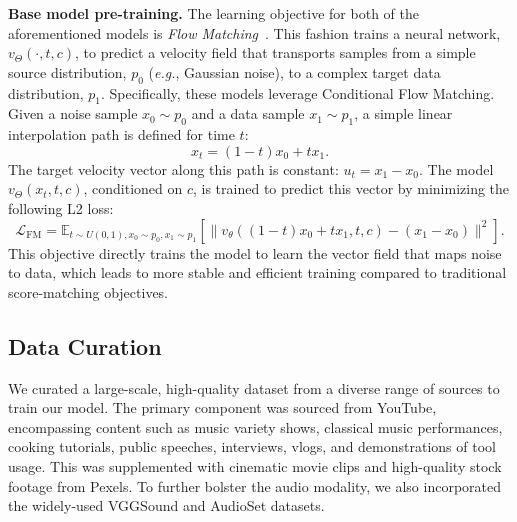 \textbf{Base model pre-training.} The learning objective for both of the aforementioned models is \textit{Flow Matching}~\cite{lipman2022flow}. This fashion trains a neural network, $v_\Theta(\cdot, t, c)$, to predict a velocity field that transports samples from a simple source distribution, $p_0$ (\textit{e.g.}, Gaussian noise), to a complex target data distribution, $p_1$. Specifically, these models leverage Conditional Flow Matching. Given a noise sample $x_0 \sim p_0$ and a data sample $x_1 \sim p_1$, a simple linear interpolation path is defined for time $t$:
\begin{equation}
    x_t = (1-t)x_0 + t x_1.
\end{equation}
The target velocity vector along this path is constant: $u_t = x_1 - x_0$. The model $v_\Theta(x_t, t, c)$, conditioned on $c$, is trained to predict this vector by minimizing the following L2 loss:
$$
\mathcal{L}_{\text{FM}} = \mathbb{E}_{t \sim U(0,1), x_0 \sim p_0, x_1 \sim p_1} \left[ \| v_\theta((1-t)x_0 + t x_1, t, c) - (x_1 - x_0) \|^2 \right].
$$
This objective directly trains the model to learn the vector field that maps noise to data, which leads to more stable and efficient training compared to traditional score-matching objectives.

\subsection{Data Curation}
We curated a large-scale, high-quality dataset from a diverse range of sources to train our model. The primary component was sourced from YouTube, encompassing content such as music variety shows, classical music performances, cooking tutorials, public speeches, interviews, vlogs, and demonstrations of tool usage. This was supplemented with cinematic movie clips and high-quality stock footage from Pexels. To further bolster the audio modality, we also incorporated the widely-used VGGSound and AudioSet datasets.

